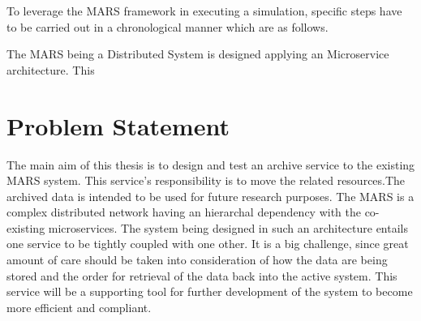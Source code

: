         \par
        To leverage the MARS framework in executing a simulation, specific steps have to be 
        carried out in a chronological manner which are as follows. 
        The MARS being a Distributed System \cite{DistributedSystems} is 
        designed applying an Microservice \cite{MicroserviceNewMan} architecture. This 

    \section{Problem Statement}

        The main aim of this thesis is to design and test an archive service
        to the existing MARS system. This service's responsibility is to move the related resources.The archived data is intended 
        to be used for future research purposes.
        The MARS is a complex distributed network having an
        hierarchal dependency with the co-existing microservices. The system being designed
        in such an architecture entails one service to be tightly coupled with one other. It is 
        a big challenge, since great amount of care should be taken into consideration of how the 
        data are being stored and the order for retrieval of the data back into the active system.
        This service will be a supporting tool for further development of the system to become more 
        efficient and compliant. 
         
